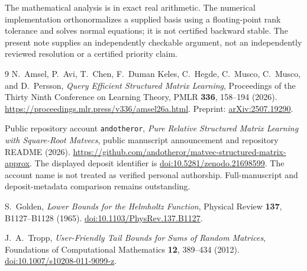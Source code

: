 \documentclass[11pt]{article}
\theoremstyle{definition}
\begin{document}
The mathematical analysis is in exact real arithmetic. The numerical implementation orthonormalizes a supplied basis using a floating-point rank tolerance and solves normal equations; it is not certified backward stable. The present note supplies an independently checkable argument, not an independently reviewed resolution or a certified priority claim.

\begin{thebibliography}{9}
N.~Amsel, P.~Avi, T.~Chen, F.~Duman Keles, C.~Hegde, C.~Musco, C.~Musco, and D.~Persson,
\emph{Query Efficient Structured Matrix Learning},
Proceedings of the Thirty Ninth Conference on Learning Theory,
PMLR \textbf{336}, 158--194 (2026).
\url{https://proceedings.mlr.press/v336/amsel26a.html}.
Preprint: \href{https://arxiv.org/abs/2507.19290}{arXiv:2507.19290}.

Public repository account \texttt{andotheror},
\emph{Pure Relative Structured Matrix Learning with Square-Root Matvecs},
public manuscript announcement and repository README (2026).
\url{https://github.com/andotheror/matvec-structured-matrix-approx}.
The displayed deposit identifier is
\href{https://doi.org/10.5281/zenodo.21698599}{doi:10.5281/zenodo.21698599}.
The account name is not treated as verified personal authorship. Full-manuscript and deposit-metadata comparison remains outstanding.

S.~Golden, \emph{Lower Bounds for the Helmholtz Function},
Physical Review \textbf{137}, B1127--B1128 (1965).
\href{https://doi.org/10.1103/PhysRev.137.B1127}{doi:10.1103/PhysRev.137.B1127}.

J.~A.~Tropp, \emph{User-Friendly Tail Bounds for Sums of Random Matrices},
Foundations of Computational Mathematics \textbf{12}, 389--434 (2012).
\href{https://doi.org/10.1007/s10208-011-9099-z}{doi:10.1007/s10208-011-9099-z}.
\end{thebibliography}
\end{document}
